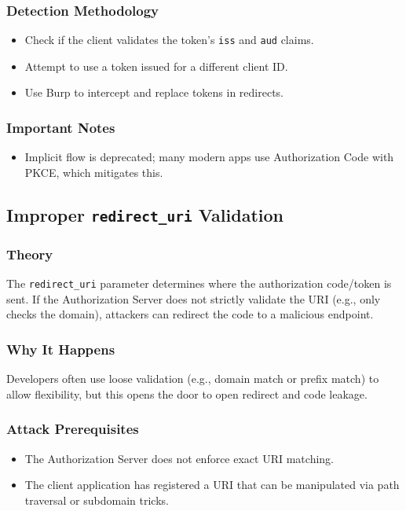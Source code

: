 \documentclass[12pt,a4paper]{article}
\begin{document}
\subsubsection{Detection Methodology}
\begin{itemize}
    \item Check if the client validates the token's \texttt{iss} and \texttt{aud} claims.
    \item Attempt to use a token issued for a different client ID.
    \item Use Burp to intercept and replace tokens in redirects.
\end{itemize}


\subsubsection{Important Notes}
\begin{itemize}
    \item Implicit flow is deprecated; many modern apps use Authorization Code with PKCE, which mitigates this.
\end{itemize}

\subsection{Improper \texttt{redirect\_uri} Validation}
\subsubsection{Theory}
The \texttt{redirect\_uri} parameter determines where the authorization code/token is sent. If the Authorization Server does not strictly validate the URI (e.g., only checks the domain), attackers can redirect the code to a malicious endpoint.

\subsubsection{Why It Happens}
Developers often use loose validation (e.g., domain match or prefix match) to allow flexibility, but this opens the door to open redirect and code leakage.

\subsubsection{Attack Prerequisites}
\begin{itemize}
    \item The Authorization Server does not enforce exact URI matching.
    \item The client application has registered a URI that can be manipulated via path traversal or subdomain tricks.
\end{itemize}
\end{document}
